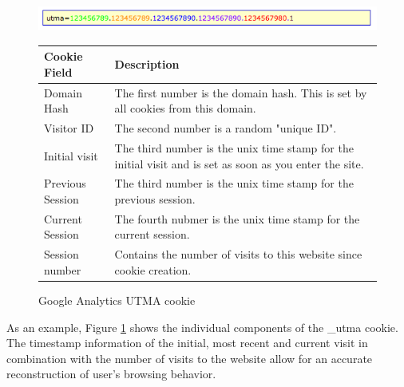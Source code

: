 \begin{figure}[h]
\centering
\includegraphics[scale=0.8]{./diagrams/utma.png}

\begin{tabular}{ | l | p{12cm} |}
    \hline
  Cookie Field & Description \\ \hline
Domain Hash & The first number is the domain hash. This is set by all cookies from this domain. \\ \hline
Visitor ID & The second number is a random "unique ID". \\ \hline
Initial visit & The third number is the unix time stamp for the initial visit and is set as soon as you enter the site. \\ \hline
Previous Session & The third number is the unix time stamp for the previous session. \\ \hline
Current Session & The fourth nubmer is the unix time stamp for the current session. \\ \hline
Session number & Contains the number of visits to this website since cookie creation. \\ \hline
 \end{tabular}

\caption{Google Analytics UTMA cookie}
\label{fig:utma}

\end{figure}

As an example, Figure \ref{fig:utma} shows the individual components of the \_utma cookie. The timestamp information of the initial, most recent and current visit in combination with the number of visits to the website allow for an accurate reconstruction of user's browsing behavior. 







